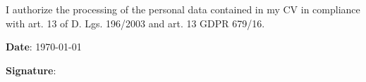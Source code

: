 \begin{cvparagraph}
    \begin{center}
        \footnotesize I authorize the processing of the personal data contained in my CV in compliance with art. 13 of D. Lgs. 196/2003 and art. 13 GDPR 679/16.
    \end{center}
    
\end{cvparagraph}
\begin{cvparagraph}
\begin{minipage}{0.5\textwidth}
\textbf{Date}: \today
\end{minipage} 
\begin{minipage}{0.5\textwidth}
\textbf{Signature}:
\end{minipage}
\end{cvparagraph}